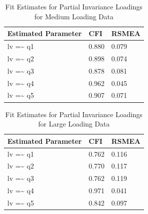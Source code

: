 \documentclass[
  man]{apa7}
\begin{document}
\begin{table}[tbp]

\begin{center}
\begin{threeparttable}

\caption{\label{tab:p-tab13}Fit Estimates for Partial Invariance Loadings for Medium Loading Data}

\begin{tabular}{lll}
\toprule
Estimated Parameter & CFI & RSMEA\\
\midrule
lv =\textasciitilde{} q1 & 0.880 & 0.079\\
lv =\textasciitilde{} q2 & 0.898 & 0.074\\
lv =\textasciitilde{} q3 & 0.878 & 0.081\\
lv =\textasciitilde{} q4 & 0.962 & 0.045\\
lv =\textasciitilde{} q5 & 0.907 & 0.071\\
\bottomrule
\end{tabular}

\end{threeparttable}
\end{center}

\end{table}

\begin{table}[tbp]

\begin{center}
\begin{threeparttable}

\caption{\label{tab:p-tab14}Fit Estimates for Partial Invariance Loadings for Large Loading Data}

\begin{tabular}{lll}
\toprule
Estimated Parameter & CFI & RSMEA\\
\midrule
lv =\textasciitilde{} q1 & 0.762 & 0.116\\
lv =\textasciitilde{} q2 & 0.770 & 0.117\\
lv =\textasciitilde{} q3 & 0.762 & 0.119\\
lv =\textasciitilde{} q4 & 0.971 & 0.041\\
lv =\textasciitilde{} q5 & 0.842 & 0.097\\
\bottomrule
\end{tabular}

\end{threeparttable}
\end{center}

\end{table}
\end{document}
